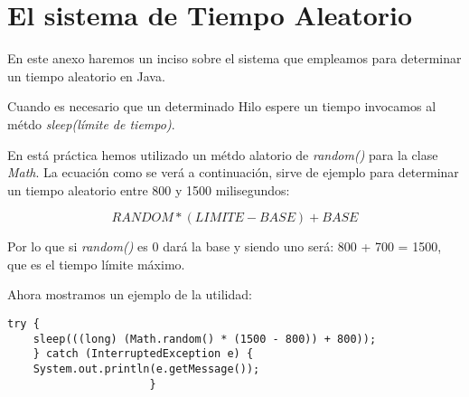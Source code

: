 \chapter{El sistema de Tiempo Aleatorio}

En este anexo haremos un inciso sobre el sistema que empleamos para determinar
un tiempo aleatorio en Java.

Cuando es necesario que un determinado Hilo espere un tiempo
invocamos al m\'etdo \textit{sleep(l\'imite de tiempo)}.

En est\'a pr\'actica hemos utilizado un m\'etdo alatorio de \textit{random()}
para la clase \textit{Math}. La ecuaci\'on como se ver\'a a continuaci\'on, sirve de ejemplo para determinar
un tiempo aleatorio entre 800 y 1500 milisegundos:

\begin{equation}
RANDOM * (LIMITE - BASE) + BASE
\end{equation}

Por lo que si \textit{random()} es 0 dar\'a la base y siendo uno ser\'a: 800 + 700 = 1500,
que es el tiempo l\'imite m\'aximo.

Ahora mostramos un ejemplo de la utilidad:

\begin{verbatim}
try {
    sleep(((long) (Math.random() * (1500 - 800)) + 800));
    } catch (InterruptedException e) {
	System.out.println(e.getMessage());
				      }		
\end{verbatim}

